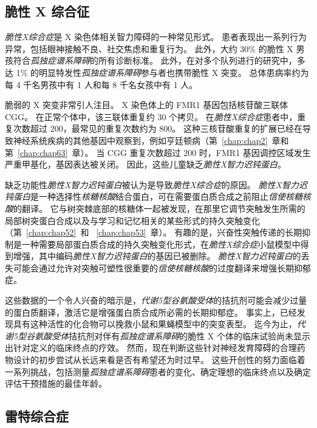 \subsection{脆性 X 综合征}

\textit{脆性X综合症}是 X 染色体相关智力障碍的一种常见形式。
患者表现出一系列行为异常，包括眼神接触不良、社交焦虑和重复行为。
此外，大约 30\% 的脆性 X 男孩符合\textit{孤独症谱系障碍}的所有诊断标准。
此外，在对多个队列进行的研究中，多达 1\% 的明显特发性\textit{孤独症谱系障碍}参与者也携带脆性 X 突变。
总体患病率约为每 4 千名男孩中有 1 人和每 8 千名女孩中有 1 人。


脆弱的 X 突变非常引人注目。
X 染色体上的 FMR1 基因包括核苷酸三联体 CGG。
在正常个体中，该三联体重复约 30 个拷贝。
在\textit{脆性X综合症}患者中，重复次数超过 200，最常见的重复次数约为 800。
这种三核苷酸重复的扩展已经在导致神经系统疾病的其他基因中观察到，例如亨廷顿病（第~\ref{chap:chap2}~章和第~\ref{chap:chap63}~章）。
当 CGG 重复次数超过 200 时，FMR1 基因调控区域发生严重甲基化，基因表达被关闭。
因此，这些儿童缺乏\textit{脆性X智力迟钝蛋白}。


缺乏功能性\textit{脆性X智力迟钝蛋白}被认为是导致\textit{脆性X综合症}的原因。
\textit{脆性X智力迟钝蛋白}是一种选择性\textit{核糖核酸}结合蛋白，可在需要蛋白质合成之前阻止\textit{信使核糖核酸}的翻译。
它与树突棘底部的核糖体一起被发现，在那里它调节突触发生所需的局部树突蛋白合成以及与学习和记忆相关的某些形式的持久突触变化（第~\ref{chap:chap52}~和 ~\ref{chap:chap53}~章）。
有趣的是，兴奋性突触传递的长期抑制是一种需要局部蛋白质合成的持久突触变化形式，在\textit{脆性X综合症}小鼠模型中得到增强，其中编码\textit{脆性X智力迟钝蛋白}的基因已被删除。
\textit{脆性X智力迟钝蛋白}的丢失可能会通过允许对突触可塑性很重要的\textit{信使核糖核酸}的过度翻译来增强长期抑郁症。


这些数据的一个令人兴奋的暗示是，\textit{代谢5型谷氨酸受体}的拮抗剂可能会减少过量的蛋白质翻译，激活它是增强蛋白质合成所必需的长期抑郁症。
事实上，已经发现具有这种活性的化合物可以挽救小鼠和果蝇模型中的突变表型。
迄今为止，\textit{代谢5型谷氨酸受体}拮抗剂对伴有\textit{孤独症谱系障碍}的脆性 X 个体的临床试验尚未显示出针对定义的临床终点的疗效。
然而，现在判断这些针对神经发育障碍的合理药物设计的初步尝试从长远来看是否有希望还为时过早。
这些开创性的努力面临着一系列挑战，包括测量\textit{孤独症谱系障碍}患者的变化、确定理想的临床终点以及确定评估干预措施的最佳年龄。



\subsection{雷特综合症}

